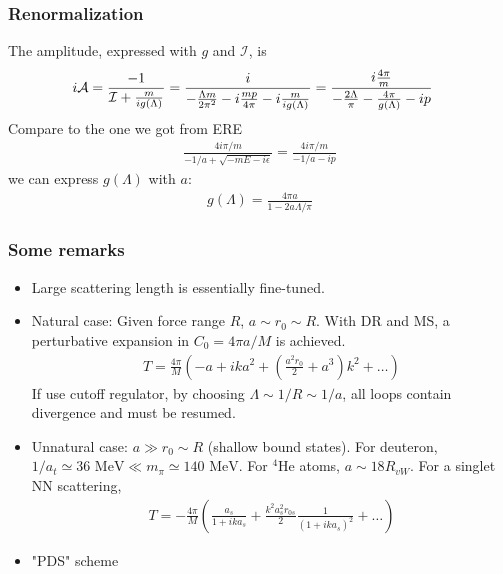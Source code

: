 \begin{frame}
	\frametitle{Renormalization}

	The amplitude, expressed with $g$ and $\mathcal{I}$, is
	\begin{align}
		i\mathcal{A} & =\frac{-1}{\mathcal{I}+\frac{m}{ig(\Lambda)}}=\frac{i}{-\frac{ \Lambda  m}{2 \pi ^2}-i\frac{m p}{4 \pi }-i\frac{m}{ig(\Lambda)}}=\frac{i\frac{4 \pi }{m}}{-\frac{ 2\Lambda  }{\pi }-\frac{4\pi}{ g(\Lambda)}-ip}
	\end{align}
	Compare to the one we got from ERE
	\begin{align}
		\frac{4 i \pi/m  }{-1/a+ \sqrt{-mE -i \epsilon }}=\frac{4 i \pi/m  }{-1/a-ip}
	\end{align}
	we can express $g(\Lambda)$ with $a$:
	\begin{align}
		g(\Lambda)=\frac{4\pi a}{1-2a\Lambda/\pi}
	\end{align}

\end{frame}

\begin{frame}
	\frametitle{Some remarks}

	\begin{itemize}
		\item Large scattering length is essentially fine-tuned.
		\item Natural case: Given force range $R$, $a\sim r_0\sim R$.
		      With DR and MS, a perturbative expansion in $C_0=4\pi a/M$ is achieved.
		      \begin{align*}
			      T=\frac{4 \pi}{M}\left(-a+i k a^{2}+\left(\frac{a^{2} r_{0}}{2}+a^{3}\right) k^{2}+\ldots\right)
		      \end{align*}
		      If use cutoff regulator, by choosing $\Lambda\sim 1/R\sim 1/a$, all loops contain divergence and must be resumed.
		\item Unnatural case: $a\gg r_0\sim R$ (shallow bound states).
		      For deuteron, $1/a_t\simeq 36 \text{ MeV}\ll m_\pi\simeq 140\text{ MeV}$. For $^4\text{He}$ atoms, $a\sim 18 R_{vW}$. For a singlet NN scattering,
		      \begin{align*}
			      T=-\frac{4 \pi}{M}\left(\frac{a_{s}}{1+i k a_{s}}+\frac{k^{2} a_{s}^{2} r_{0 s}}{2} \frac{1}{\left(1+i k a_{s}\right)^{2}}+\ldots\right)
		      \end{align*}
		\item "PDS" scheme
	\end{itemize}

\end{frame}


